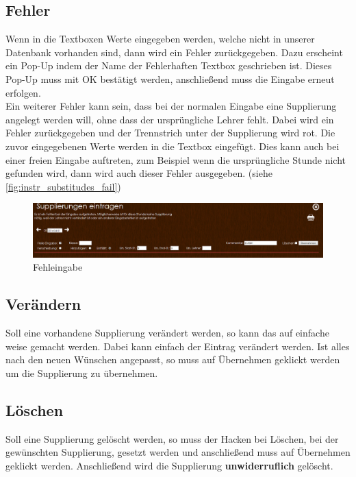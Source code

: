 \subsection{Fehler}
Wenn in die Textboxen Werte eingegeben werden, welche nicht in unserer Datenbank vorhanden sind, dann wird ein Fehler zurückgegeben. Dazu erscheint ein Pop-Up indem der Name der Fehlerhaften Textbox geschrieben ist. Dieses Pop-Up muss mit OK bestätigt werden, anschließend muss die Eingabe erneut erfolgen.\\
Ein weiterer Fehler kann sein, dass bei der normalen Eingabe eine Supplierung angelegt werden will, ohne dass der ursprüngliche Lehrer fehlt. Dabei wird ein Fehler zurückgegeben und der Trennstrich unter der Supplierung wird rot. Die zuvor eingegebenen Werte werden in die Textbox eingefügt. Dies kann auch bei einer freien Eingabe auftreten, zum Beispiel wenn die ursprüngliche Stunde nicht gefunden wird, dann wird auch dieser Fehler ausgegeben. (siehe \autoref{fig:instr_substitudes_fail})
\begin{figure}[H]
\centering
\includegraphics[keepaspectratio=true, width=17cm]{images/screenshots/substitudes_fail.png}
\caption{Fehleingabe}
\label{fig:instr_substitudes_fail}
\end{figure}
\subsection{Verändern}
Soll eine vorhandene Supplierung verändert werden, so kann das auf einfache weise gemacht werden. Dabei kann einfach der Eintrag verändert werden. Ist alles nach den neuen Wünschen angepasst, so muss auf Übernehmen geklickt werden um die Supplierung zu übernehmen.
\subsection{Löschen}
Soll eine Supplierung gelöscht werden, so muss der Hacken bei Löschen, bei der gewünschten Supplierung, gesetzt werden und anschließend muss auf Übernehmen geklickt werden. Anschließend wird die Supplierung \textbf{unwiderruflich} gelöscht.